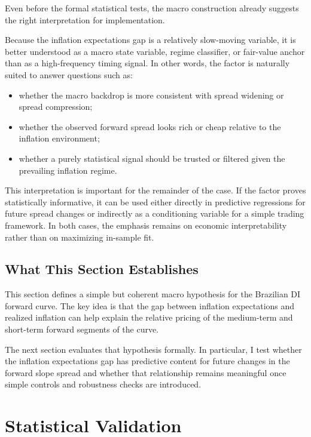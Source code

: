 \documentclass[11pt]{article}
\begin{document}
	Even before the formal statistical tests, the macro construction already suggests the right interpretation for implementation.
	
	Because the inflation expectations gap is a relatively slow-moving variable, it is better understood as a macro state variable, regime classifier, or fair-value anchor than as a high-frequency timing signal. In other words, the factor is naturally suited to answer questions such as:
	\begin{itemize}
		\item whether the macro backdrop is more consistent with spread widening or spread compression;
		\item whether the observed forward spread looks rich or cheap relative to the inflation environment;
		\item whether a purely statistical signal should be trusted or filtered given the prevailing inflation regime.
	\end{itemize}
	
	This interpretation is important for the remainder of the case. If the factor proves statistically informative, it can be used either directly in predictive regressions for future spread changes or indirectly as a conditioning variable for a simple trading framework. In both cases, the emphasis remains on economic interpretability rather than on maximizing in-sample fit.
	
	\subsection{What This Section Establishes}
	\label{subsec:macro_section_takeaway}
	
	This section defines a simple but coherent macro hypothesis for the Brazilian DI forward curve. The key idea is that the gap between inflation expectations and realized inflation can help explain the relative pricing of the medium-term and short-term forward segments of the curve.
	
	The next section evaluates that hypothesis formally. In particular, I test whether the inflation expectations gap has predictive content for future changes in the forward slope spread and whether that relationship remains meaningful once simple controls and robustness checks are introduced.
	
	\section{Statistical Validation}
	\label{sec:statistical_validation}
	
\end{document}
